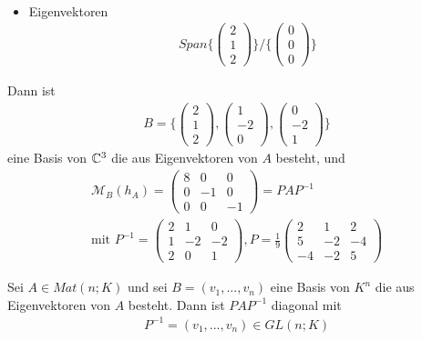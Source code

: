 \begin{itemize}
\begin{align}
\end{align}
\item Eigenvektoren
\begin{align}
Span\{\begin{pmatrix} 2 \\ 1 \\ 2 \end{pmatrix}\} / \{\begin{pmatrix} 0 \\ 0 \\ 0 \end{pmatrix}\}
\end{align}
\end{itemize}
Dann ist 
\begin{align}
B = \{\begin{pmatrix} 2 \\ 1 \\ 2 \end{pmatrix}, \begin{pmatrix} 1 \\ -2 \\ 0 \end{pmatrix}, \begin{pmatrix} 0 \\ -2 \\ 1 \end{pmatrix}\}
\end{align}
eine Basis von $\mathbb{C}^3$ die aus Eigenvektoren von $A$ besteht, und
\begin{align}
\mathcal{M}_B(h_A) = \begin{pmatrix} 8 & 0 & 0 \\ 0 & -1 & 0 \\ 0 & 0 & -1 \end{pmatrix} = PAP^{-1} \\
\text{mit } P^{-1} = \begin{pmatrix} 2 & 1 & 0 \\ 1 & -2 & -2 \\ 2 & 0 & 1 \end{pmatrix}, P = \frac{1}{9} \begin{pmatrix} 2 & 1 & 2 \\ 5 & -2 & -4 \\ -4 & -2 & 5 \end{pmatrix}
\end{align}

\begin{satz} %
\label{satz245}
Sei $A \in Mat(n;K)$ und sei $B= (v_1, ..., v_n)$ eine Basis von $K^n$ die aus Eigenvektoren von $A$ besteht.
Dann ist $PAP^{-1}$ diagonal mit
\begin{align}
P^{-1} = (v_1, ..., v_n) \in GL(n;K)
\end{align}
\end{satz}

